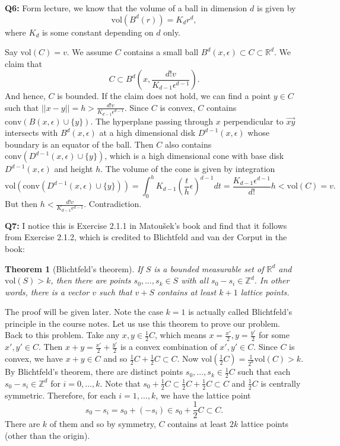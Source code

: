 \documentclass[12pt,reqno]{amsart}
\newtheorem{theorem}{Theorem}[section]
\theoremstyle{definition}
\newcommand{\ZZ}{\mathbb{Z}}
\newcommand{\RR}{\mathbb{R}}
\newcommand{\conv}[1]{\mathrm{conv}(#1)}
\newcommand{\vol}[1]{\mathrm{vol}(#1)}
\begin{document}
\noindent \textbf{Q6:}  Form lecture, we know that the volume of a ball in dimension $d$ is given by $$\vol{B^d(r)} =K_d r^d ,$$ where $K_d$ is some constant depending on $d$ only.

Say $\vol{C}=v$. We assume $C$ contains a small ball $B^d(x,\epsilon)\subset C\subset \RR^d$. We claim that $$C\subset B^d(x,  \frac{d! v}{K_{d-1}  \epsilon^{d-1}}).$$ And hence, $C$ is bounded. If the claim does not hold, we can find a point $y\in C$ such that $||x-y|| = h >  \frac{d! v}{K_{d-1}  \epsilon^{d-1}}$. Since $C$ is convex, $C$ contains $\conv{ B(x,\epsilon) \cup \{y\}}$. The hyperplane passing through $x$ perpendicular to $\overrightarrow{xy}$ intersects with $B^d(x,\epsilon)$ at a high dimensional disk $D^{d-1}(x,\epsilon)$ whose boundary is an equator of the ball. Then $C$ also contains $\conv{ D^{d-1}(x,\epsilon) \cup \{y\}}$, which is a high dimensional cone with base disk $D^{d-1}(x,\epsilon)$ and height $h$. The volume of the cone is given by integration $$\vol{  \conv{ D^{d-1}(x,\epsilon) \cup \{y\}}} = \int_{0}^h   K_{d-1} (\frac{t}{h} \epsilon)^{d-1} dt   = \frac{K_{d-1} \epsilon^{d-1}
  }{d!} h < \vol{C}=v.$$
But then $h < \frac{d! v}{K_{d-1}  \epsilon^{d-1}}$. Contradiction.

\newpage

\noindent \textbf{Q7:}
I notice this is Exercise 2.1.1 in Matou\v{s}ek's book and find that it follows from Exercise 2.1.2, which is credited to Blichtfeld and van der Corput in the book:

\begin{theorem}[Blichtfeld's theorem]
  If $S$ is a bounded measurable set of $\RR^d$ and $\vol{S}>k$, then there are points $s_0,\dots,s_{k}\in S$ with all $s_0-s_i\in \ZZ^d$. In other words, there is a vector $v$ such that $v+S$ contains at least $k+1$ lattice points.
\end{theorem}
\noindent The proof will be given later. Note the case $k=1$ is actually called Blichtfeld's principle in the course notes. Let us use this theorem to prove our problem.\\



Back to this problem. Take any $x, y \in \frac{1}{2} C$, which means $x=\frac{x'}{2}, y=\frac{y'}{2}$ for some $x',y'\in C$. Then $x+y=\frac{x'}{2} +\frac{y'}{2}$ is a convex combination of $x',y'\in C$. Since $C$ is convex, we have $x+y\in C$ and so $\frac{1}{2}C+\frac{1}{2}C \subset C$. Now $\vol{\frac{1}{2} C} = \frac{1}{2^d} \vol{C} > k$. By Blichtfeld's theorem, there are distinct points $s_0,\dots,s_k \in \frac{1}{2}C$ such that each $s_0-s_i \in \ZZ^d$ for $i=0,\dots,k$. Note that $ s_0+\frac{1}{2} C \subset \frac{1}{2} C+\frac{1}{2} C\subset C$ and $\frac{1}{2} C$ is centrally symmetric. Therefore, for each $i=1,\dots,k$, we have the lattice point $$s_0-s_i = s_0+(-s_i)\in s_0+\frac{1}{2} C\subset C.$$ There are $k$ of them and so by symmetry, $C$ contains at least $2k$ lattice points (other than the origin).\\
\end{document}

